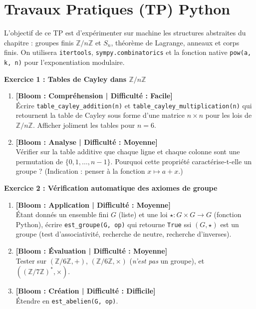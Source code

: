\documentclass[12pt,a4paper]{report}
\theoremstyle{definition}
\theoremstyle{remark}
\begin{document}
\section*{Travaux Pratiques (TP) Python}

\vspace{0.3cm}
\noindent L'objectif de ce TP est d'expérimenter sur machine les structures abstraites du chapitre : groupes finis $\mathbb{Z}/n\mathbb{Z}$ et $S_n$, théorème de Lagrange, anneaux et corps finis. On utilisera \texttt{itertools}, \texttt{sympy.combinatorics} et la fonction native \texttt{pow(a, k, n)} pour l'exponentiation modulaire.

\vspace{0.3cm}

\noindent\textbf{Exercice 1 : Tables de Cayley dans $\mathbb{Z}/n\mathbb{Z}$}
\begin{enumerate}
    \item \textbf{[Bloom : Compréhension | Difficulté : Facile]} \\
    Écrire \texttt{table\_cayley\_addition(n)} et \texttt{table\_cayley\_multiplication(n)} qui retournent la table de Cayley sous forme d'une matrice $n \times n$ pour les lois de $\mathbb{Z}/n\mathbb{Z}$. Afficher joliment les tables pour $n = 6$.
    \item \textbf{[Bloom : Analyse | Difficulté : Moyenne]} \\
    Vérifier sur la table additive que chaque ligne et chaque colonne sont une permutation de $\{0, 1, \dots, n-1\}$. Pourquoi cette propriété caractérise-t-elle un groupe ? (Indication : penser à la fonction $x \mapsto a + x$.)
\end{enumerate}

\vspace{0.3cm}

\noindent\textbf{Exercice 2 : Vérification automatique des axiomes de groupe}
\begin{enumerate}
    \item \textbf{[Bloom : Application | Difficulté : Moyenne]} \\
    Étant donnés un ensemble fini $G$ (liste) et une loi $\star : G \times G \to G$ (fonction Python), écrire \texttt{est\_groupe(G, op)} qui retourne \texttt{True} ssi $(G, \star)$ est un groupe (test d'associativité, recherche de neutre, recherche d'inverses).
    \item \textbf{[Bloom : Évaluation | Difficulté : Moyenne]} \\
    Tester sur $(\mathbb{Z}/6\mathbb{Z}, +)$, $(\mathbb{Z}/6\mathbb{Z}, \times)$ (\emph{n'est pas} un groupe), et $((\mathbb{Z}/7\mathbb{Z})^*, \times)$.
    \item \textbf{[Bloom : Création | Difficulté : Difficile]} \\
    Étendre en \texttt{est\_abelien(G, op)}.
\end{enumerate}
\end{document}
